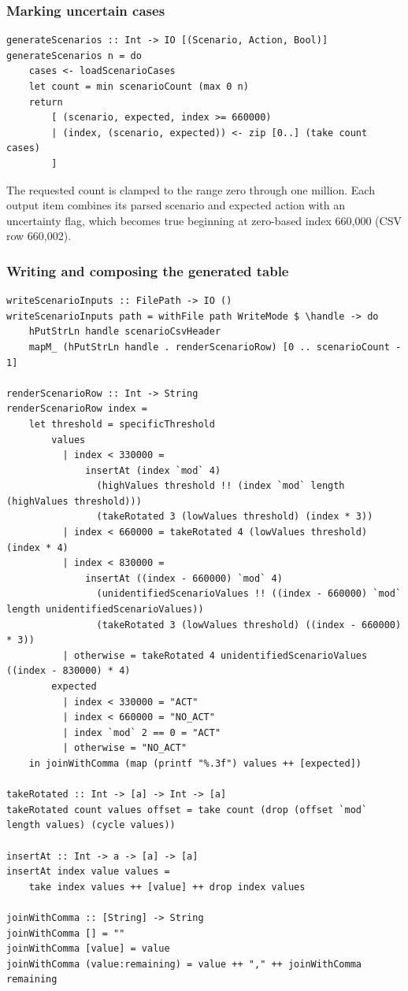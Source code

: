 \documentclass[11pt]{article}
\begin{document}
\subsubsection{Marking uncertain cases}

\begin{lstlisting}
generateScenarios :: Int -> IO [(Scenario, Action, Bool)]
generateScenarios n = do
    cases <- loadScenarioCases
    let count = min scenarioCount (max 0 n)
    return
        [ (scenario, expected, index >= 660000)
        | (index, (scenario, expected)) <- zip [0..] (take count cases)
        ]
\end{lstlisting}

The requested count is clamped to the range zero through one million.
Each output item combines its parsed scenario and expected action with an
uncertainty flag, which becomes true beginning at zero-based index 660,000
(CSV row 660,002).

\subsubsection{Writing and composing the generated table}

\begin{lstlisting}
writeScenarioInputs :: FilePath -> IO ()
writeScenarioInputs path = withFile path WriteMode $ \handle -> do
    hPutStrLn handle scenarioCsvHeader
    mapM_ (hPutStrLn handle . renderScenarioRow) [0 .. scenarioCount - 1]

renderScenarioRow :: Int -> String
renderScenarioRow index =
    let threshold = specificThreshold
        values
          | index < 330000 =
              insertAt (index `mod` 4)
                (highValues threshold !! (index `mod` length (highValues threshold)))
                (takeRotated 3 (lowValues threshold) (index * 3))
          | index < 660000 = takeRotated 4 (lowValues threshold) (index * 4)
          | index < 830000 =
              insertAt ((index - 660000) `mod` 4)
                (unidentifiedScenarioValues !! ((index - 660000) `mod` length unidentifiedScenarioValues))
                (takeRotated 3 (lowValues threshold) ((index - 660000) * 3))
          | otherwise = takeRotated 4 unidentifiedScenarioValues ((index - 830000) * 4)
        expected
          | index < 330000 = "ACT"
          | index < 660000 = "NO_ACT"
          | index `mod` 2 == 0 = "ACT"
          | otherwise = "NO_ACT"
    in joinWithComma (map (printf "%.3f") values ++ [expected])

takeRotated :: Int -> [a] -> Int -> [a]
takeRotated count values offset = take count (drop (offset `mod` length values) (cycle values))

insertAt :: Int -> a -> [a] -> [a]
insertAt index value values =
    take index values ++ [value] ++ drop index values

joinWithComma :: [String] -> String
joinWithComma [] = ""
joinWithComma [value] = value
joinWithComma (value:remaining) = value ++ "," ++ joinWithComma remaining
\end{lstlisting}
\end{document}
